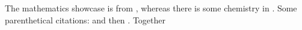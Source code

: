 \documentclass{article}
\begin{document}
The mathematics showcase is from \citet{Graham1995}, whereas
there is some chemistry in \citet{Thomas2008}.
Some parenthetical citations: \citep{Graham1995}
and then \citep[p.~56]{Thomas2008}.
\citep[See][pp.~45--48]{Graham1995}
Together \citep{Graham1995,Thomas2008}


\end{document}
